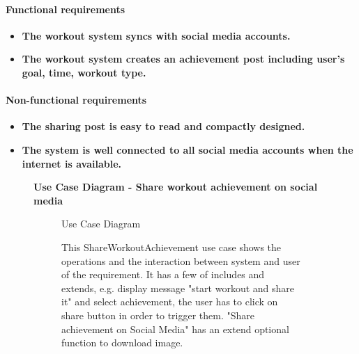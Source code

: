 \documentclass{article}
\begin{document}
		\paragraph{Functional requirements}

		\begin{itemize}
			\item \textbf{The workout system syncs with social media accounts.}
			\item \textbf{The workout system creates an achievement post including user's goal, time, workout type.}
		\end{itemize}
		
		\paragraph{Non-functional requirements}
		
		\begin{itemize}
			\item \textbf{The sharing post is easy to read and compactly designed.}
			\item \textbf{The system is well connected to all social media accounts when the internet is available.}
		\end{itemize}
		
		\clearpage

	\begin{figure}[htbp]
		\textbf{Use Case Diagram - Share workout achievement on social media }
		\centering
		\begin{subfigure}{\textwidth}
			\resizebox{\textwidth}{!}{}
			\caption{Use Case Diagram}
		\end{subfigure}
		\begin{subfigure}{\textwidth}
			This ShareWorkoutAchievement use case shows the operations and the interaction between system and user
			of the requirement. It has a few of includes and extends, e.g. display message "start workout and share it" and
			select achievement, the user has to click on share button in order to trigger them. "Share achievement on Social Media" has an extend
			optional function to download image. 
		\end{subfigure}
	\end{figure}

	\clearpage
\end{document}
